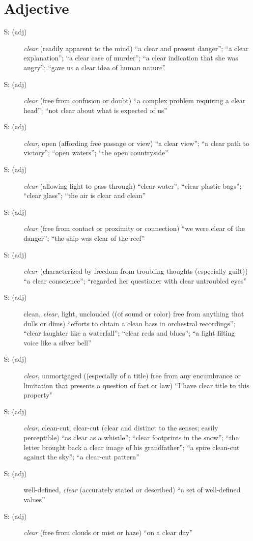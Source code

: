 \section{Adjective}
\begin{description}
  \item [S: (adj)] \emph{clear} (readily apparent to the mind) ``a clear and present danger''; ``a clear explanation''; ``a clear case of murder''; ``a clear indication that she was angry''; ``gave us a clear idea of human nature''
  \item [S: (adj)] \emph{clear} (free from confusion or doubt) ``a complex problem requiring a clear head''; ``not clear about what is expected of us''
  \item [S: (adj)] \emph{clear}, open (affording free passage or view) ``a clear view''; ``a clear path to victory''; ``open waters''; ``the open countryside''
  \item [S: (adj)] \emph{clear} (allowing light to pass through) ``clear water''; ``clear plastic bags''; ``clear glass''; ``the air is clear and clean''
  \item [S: (adj)] \emph{clear} (free from contact or proximity or connection) ``we were clear of the danger''; ``the ship was clear of the reef''
  \item [S: (adj)] \emph{clear} (characterized by freedom from troubling thoughts (especially guilt)) ``a clear conscience''; ``regarded her questioner with clear untroubled eyes''
  \item [S: (adj)] clean, \emph{clear}, light, unclouded ((of sound or color) free from anything that dulls or dims) ``efforts to obtain a clean bass in orchestral recordings''; ``clear laughter like a waterfall''; ``clear reds and blues''; ``a light lilting voice like a silver bell''
  \item [S: (adj)] \emph{clear}, unmortgaged ((especially of a title) free from any encumbrance or limitation that presents a question of fact or law) ``I have clear title to this property''
  \item [S: (adj)] \emph{clear}, clean-cut, clear-cut (clear and distinct to the senses; easily perceptible) ``as clear as a whistle''; ``clear footprints in the snow''; ``the letter brought back a clear image of his grandfather''; ``a spire clean-cut against the sky''; ``a clear-cut pattern''
  \item [S: (adj)] well-defined, \emph{clear} (accurately stated or described) ``a set of well-defined values''
  \item [S: (adj)] \emph{clear} (free from clouds or mist or haze) ``on a clear day''

\end{description}
